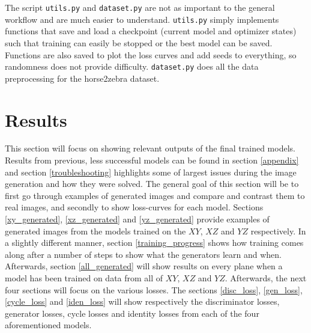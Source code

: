 \documentclass[12pt, fleqn, titlepage]{article}
\begin{document}
The script \texttt{utils.py} and \texttt{dataset.py} are not as important to the general workflow and are much easier to understand. \texttt{utils.py} simply implements functions that save and load a checkpoint (current model and optimizer states) such that training can easily be stopped or the best model can be saved. Functions are also saved to plot the loss curves and add seeds to everything, so randomness does not provide difficulty. \texttt{dataset.py} does all the data preprocessing for the horse2zebra dataset.

\section{Results}\label{results}



This section will focus on showing relevant outputs of the final trained models. Results from previous, less successful models can be found in section \ref{appendix} and section \ref{troubleshooting} highlights some of largest issues during the image generation and how they were solved. The general goal of this section will be to first go through examples of generated images and compare and contrast them to real images, and secondly to show loss-curves for each model. Sections \ref{xy_generated}, \ref{xz_generated} and \ref{yz_generated} provide examples of generated images from the models trained on the $XY$, $XZ$ and $YZ$ respectively. In a slightly different manner, section \ref{training_progress} shows how training comes along after a number of steps to show what the generators learn and when. Afterwards, section \ref{all_generated} will show results on every plane when a model has been trained on data from all of $XY$, $XZ$ and $YZ$. Afterwards, the next four sections will focus on the various losses. The sections \ref{disc_loss}, \ref{gen_loss}, \ref{cycle_loss} and \ref{iden_loss} will show respectively the discriminator losses, generator losses, cycle losses and identity losses from each of the four aforementioned models.
\end{document}

